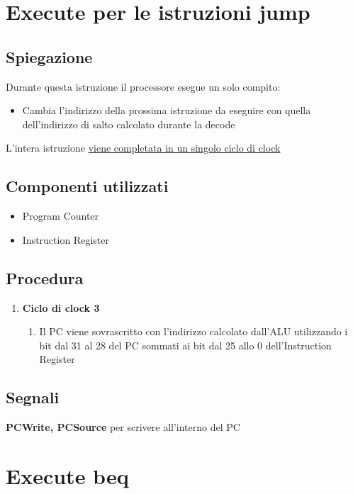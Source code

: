 \newpage

\section{Execute per le istruzioni jump}
\subsection{Spiegazione}
Durante questa istruzione il processore esegue un solo compito:
\begin{itemize}
    \item Cambia l'indirizzo della prossima istruzione da eseguire con quella dell'indirizzo di salto calcolato durante la decode
\end{itemize}

L'intera istruzione \uline{viene completata in un singolo ciclo di clock}

\subsection{Componenti utilizzati}
\begin{itemize}
    \item Program Counter
    \item Instruction Register
\end{itemize}

\subsection{Procedura}
\begin{enumerate}
    \item[3.] \textbf{Ciclo di clock 3}
        \begin{enumerate}[label=\theenumi.\arabic*]
            \item [3.1] Il PC viene sovrascritto con l'indirizzo calcolato dall'ALU utilizzando i bit dal 31 al 28 del PC sommati ai bit dal 25 allo 0 dell'Instruction Register
        \end{enumerate}
\end{enumerate}

\subsection{Segnali}
\textbf{PCWrite, PCSource} per scrivere all'interno del PC

\newpage

\section{Execute beq}
